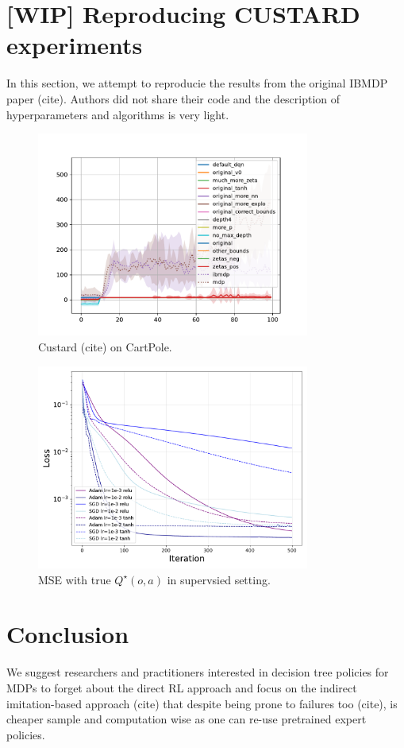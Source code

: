 \section{[WIP] Reproducing CUSTARD experiments}
In this section, we attempt to reproducie the results from the original IBMDP paper (cite). Authors did not share their code and the description of hyperparameters and algorithms is very light.
\begin{figure}
    \centering
    \includegraphics[width=0.8\textwidth]{images/images_part1/test.pdf}
    \caption{Custard (cite) on CartPole.}
\end{figure}

\begin{figure}
    \centering
    \includegraphics[width=0.8\textwidth]{images/images_part1/repre.pdf}
    \caption{MSE with true $Q^\star(o,a)$ in supervsied setting.}
\end{figure}

\section{Conclusion}
We suggest researchers and practitioners interested in decision tree policies for MDPs to forget about the direct RL approach and focus on the indirect imitation-based approach (cite) that despite being prone to failures too (cite), is cheaper sample and computation wise as one can re-use pretrained expert policies.

